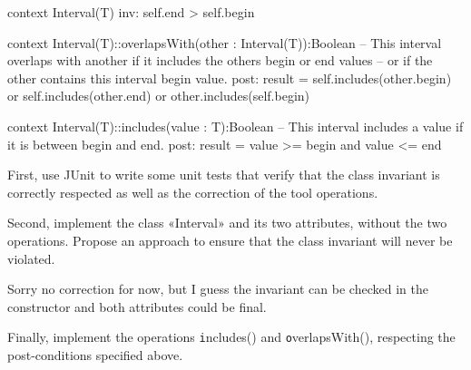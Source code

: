 \documentclass[a4paper,11pt]{memoir}
\newcommand{\code}[1]{{\texttt #1}}
\begin{document}
\begin{ocl}
context Interval(T)
inv: self.end > self.begin
\end{ocl}

\begin{ocl}
context Interval(T)::overlapsWith(other : Interval(T)):Boolean
-- This interval overlaps with another if it includes the others begin or end values
-- or if the other contains this interval begin value.
post: result = self.includes(other.begin) or self.includes(other.end) or
			other.includes(self.begin)
\end{ocl}


\begin{ocl}
context Interval(T)::includes(value : T):Boolean
-- This interval includes a value if it is between begin and end.
post: result = value >= begin and value <= end
\end{ocl}


\begin{exercise}
	First, use JUnit to write some unit tests that verify that the class invariant is correctly respected as well as the correction of the tool operations.
\end{exercise}

\begin{solution}
	\lstset{language=Java}
	
\end{solution}

\begin{exercise}
	Second, implement the class «Interval» and its two attributes, without the two operations.
	Propose an approach to ensure that the class invariant will never be violated.
\end{exercise}

\begin{solution}
	Sorry no correction for now, but I guess the invariant can be checked in the constructor and both attributes could be final.
\end{solution}

\begin{exercise}
	 Finally, implement the operations \code{includes()} and \code{overlapsWith()}, respecting the post-conditions specified above.
\end{exercise}
\end{document}

